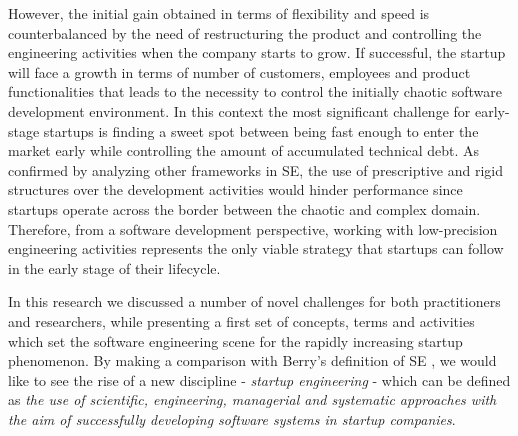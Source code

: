 \documentclass[10pt,journal,letterpaper,compsoc]{IEEEtran}
\begin{document}
However, the initial gain obtained in terms of flexibility and speed is 
counterbalanced by the need of restructuring the product and controlling the 
engineering activities when the company starts to grow. If successful, the 
startup will face a growth in terms of number of customers, employees and 
product functionalities that leads to the necessity to control the initially 
chaotic software development environment. In this context the most significant 
challenge for early-stage startups is finding a sweet spot between being fast 
enough to enter the market early while controlling the amount of accumulated 
technical debt.  As confirmed by analyzing other frameworks in SE, the use of 
prescriptive and rigid structures over the development activities would hinder 
performance since startups operate across the border between the chaotic and 
complex domain. %
Therefore, from a software development perspective, working with low-precision 
engineering activities represents the only viable strategy that startups can 
follow in the early stage of their lifecycle.

In this research we discussed a number of novel challenges for both 
practitioners and researchers, while presenting a first set of concepts, terms 
and activities which set the software engineering scene for the rapidly 
increasing startup phenomenon. By making a comparison with Berry's definition of 
SE \cite{Berry1992}, we would like to see the rise of a new discipline - 
\textit{startup engineering} - which can be defined as  \textit{the use of 
scientific, engineering, managerial and systematic approaches with the aim of 
successfully developing software systems in startup companies}. %


%
\end{document}
